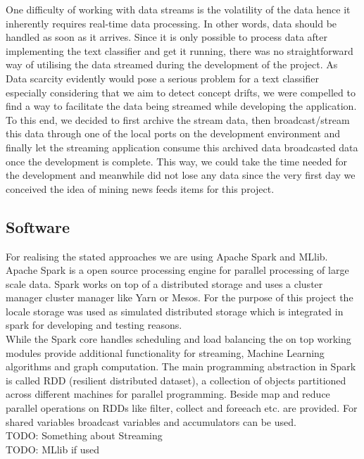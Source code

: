 \documentclass[12pt]{article}
\begin{document}
    


One difficulty of working with data streams is the volatility of the data hence it inherently requires real-time data processing. In other words,  data should be handled as soon as it arrives. Since it is only possible to process data after implementing the text classifier and get it running, there was no straightforward way of utilising the data streamed during the development of the project. As Data scarcity evidently would pose a serious problem for a text classifier especially considering that we aim to detect concept drifts, we were compelled to find a way to facilitate the data being streamed while developing the application. To this end, we decided to first archive the stream data, then broadcast/stream this data through one of the local ports on the development environment and finally let the streaming application consume this archived data broadcasted data once the development is complete. This way, we could take the time needed for the development and meanwhile did not lose any data since the very first day we conceived the idea of mining news feeds items for this project.
\subsection{Software}
For realising the stated approaches we are using Apache Spark and MLlib. Apache Spark is a open source processing engine for parallel processing of large scale data. Spark works on top of a distributed storage and uses a cluster manager cluster manager like Yarn or Mesos. For the purpose of this project the locale storage was used as simulated distributed storage which is integrated in spark for developing and testing reasons.  \\
While the Spark core handles scheduling and load balancing the on top working modules provide additional functionality for streaming, Machine Learning  algorithms and graph computation. The main programming abstraction in Spark is called RDD (resilient distributed dataset), a collection of objects partitioned across different machines for parallel programming. Beside map and reduce parallel operations on RDDs like filter, collect and foreeach etc. are provided. For shared variables broadcast variables and  accumulators can be used.
\\ 
TODO: Something about Streaming
\\
TODO: MLlib if used
\end{document}
